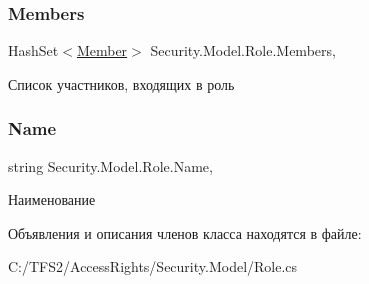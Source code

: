\subsubsection{\texorpdfstring{Members}{Members}}
{\footnotesize\ttfamily Hash\+Set$<$\hyperlink{class_security_1_1_model_1_1_member}{Member}$>$ Security.\+Model.\+Role.\+Members\hspace{0.3cm}{\ttfamily [get]}, {\ttfamily [set]}}



Список участников, входящих в роль 

\mbox{\label{class_security_1_1_model_1_1_role_a661e0b10075130d934665b6857bb7dfa}} 
\subsubsection{\texorpdfstring{Name}{Name}}
{\footnotesize\ttfamily string Security.\+Model.\+Role.\+Name\hspace{0.3cm}{\ttfamily [get]}, {\ttfamily [set]}}



Наименование 



Объявления и описания членов класса находятся в файле\+:\begin{DoxyCompactItemize}
\item 
C\+:/\+T\+F\+S2/\+Access\+Rights/\+Security.\+Model/Role.\+cs\end{DoxyCompactItemize}
